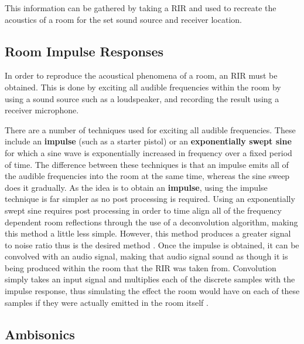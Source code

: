 \documentclass[../../main.tex]{subfiles}
\begin{document}
		This information can be gathered by taking a \ac{RIR} and used to recreate the acoustics of a room for the set sound source and receiver location.

	\subsection{Room Impulse Responses}

		In order to reproduce the acoustical phenomena of a room, an \ac{RIR} must be obtained. This is done by exciting all audible frequencies within the room by using a sound source such as a loudspeaker, and recording the result using a receiver microphone.

		There are a number of techniques used for exciting all audible frequencies. These include an \textbf{impulse} (such as a starter pistol) or an \textbf{exponentially swept sine} for which a sine wave is exponentially increased in frequency over a fixed period of time. The difference between these techniques is that an impulse emits all of the audible frequencies into the room at the same time, whereas the sine sweep does it gradually. As the idea is to obtain an \textbf{impulse}, using the impulse technique is far simpler as no post processing is required. Using an exponentially swept sine requires post processing in order to time align all of the frequency dependent room reflections through the use of a deconvolution algorithm, making this method a little less simple. However, this method produces a greater signal to noise ratio thus is the desired method \cite{Stan2002}. Once the impulse is obtained, it can be convolved with an audio signal, making that audio signal sound as though it is being produced within the room that the \ac{RIR} was taken from. Convolution simply takes an input signal and multiplies each of the discrete samples with the impulse response, thus simulating the effect the room would have on each of these samples if they were actually emitted in the room itself \cite{Smith2003}.

	\subsection{Ambisonics}


\end{document}
